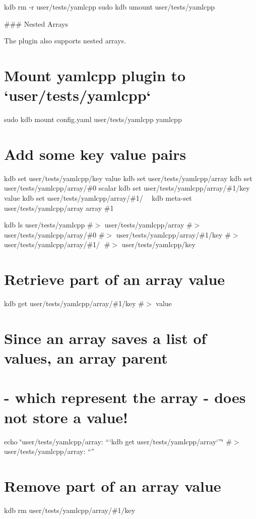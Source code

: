 kdb rm -\/r user/tests/yamlcpp sudo kdb umount user/tests/yamlcpp 
\begin{DoxyCode}
### Nested Arrays

The plugin also supports nested arrays.
\end{DoxyCode}
 \hypertarget{autotoc_md865_autotoc_md893}{}\section{Mount yamlcpp plugin to `user/tests/yamlcpp`}\label{autotoc_md865_autotoc_md893}
sudo kdb mount config.\+yaml user/tests/yamlcpp yamlcpp\hypertarget{autotoc_md865_autotoc_md894}{}\section{Add some key value pairs}\label{autotoc_md865_autotoc_md894}
kdb set user/tests/yamlcpp/key value kdb set user/tests/yamlcpp/array kdb set user/tests/yamlcpp/array/\#0 scalar kdb set user/tests/yamlcpp/array/\#1/key value kdb set user/tests/yamlcpp/array/\#1/🔑 🙈 kdb meta-\/set user/tests/yamlcpp/array array \textquotesingle{}\#1\textquotesingle{}

kdb ls user/tests/yamlcpp \#$>$ user/tests/yamlcpp/array \#$>$ user/tests/yamlcpp/array/\#0 \#$>$ user/tests/yamlcpp/array/\#1/key \#$>$ user/tests/yamlcpp/array/\#1/🔑 \#$>$ user/tests/yamlcpp/key\hypertarget{autotoc_md865_autotoc_md895}{}\section{Retrieve part of an array value}\label{autotoc_md865_autotoc_md895}
kdb get user/tests/yamlcpp/array/\#1/key \#$>$ value\hypertarget{autotoc_md865_autotoc_md896}{}\section{Since an array saves a list of values, an array parent}\label{autotoc_md865_autotoc_md896}
\hypertarget{autotoc_md865_autotoc_md897}{}\section{-\/ which represent the array -\/ does not store a value!}\label{autotoc_md865_autotoc_md897}
echo \char`\"{}user/tests/yamlcpp/array\+: “`kdb get user/tests/yamlcpp/array`”\char`\"{} \#$>$ user/tests/yamlcpp/array\+: “”\hypertarget{autotoc_md865_autotoc_md898}{}\section{Remove part of an array value}\label{autotoc_md865_autotoc_md898}
kdb rm user/tests/yamlcpp/array/\#1/key

